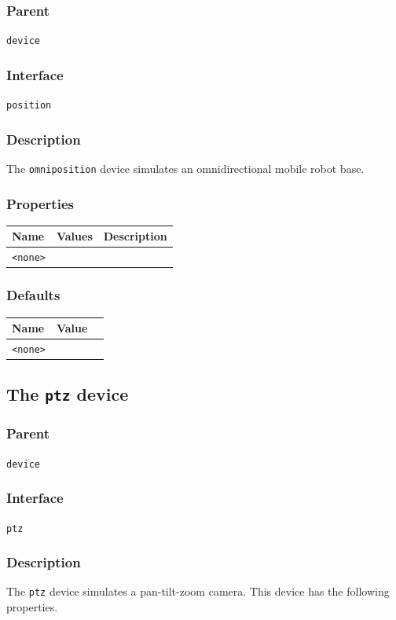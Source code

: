 \documentclass[11pt,twoside]{report}
\begin{document}
\subsubsection*{Parent}
{\tt device}

\subsubsection*{Interface}
{\tt position}

\subsubsection*{Description}
The {\tt omniposition} device simulates an omnidirectional mobile robot base.

\subsubsection*{Properties}
\begin{tabularx}{\columnwidth}{llX}
\hline
Name & Values & Description \\
\hline
\verb'<none>'\\
\hline
\end{tabularx}

\subsubsection*{Defaults}
\begin{tabularx}{\columnwidth}{llX}
\hline
Name & Value\\
\hline
\verb'<none>'\\
\hline
\end{tabularx}


\newpage
\subsection{The {\tt ptz} device}

\subsubsection*{Parent}
{\tt device}

\subsubsection*{Interface}
{\tt ptz}

\subsubsection*{Description}
The {\tt ptz} device simulates a pan-tilt-zoom camera.
This device has the following properties.
\end{document}
